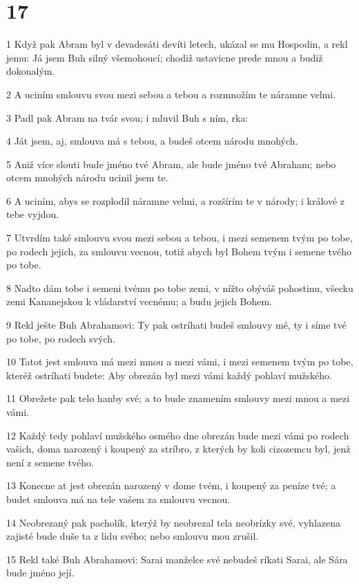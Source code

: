 \chapter{17}

\par 1 Když pak Abram byl v devadesáti devíti letech, ukázal se mu Hospodin, a rekl jemu: Já jsem Buh silný všemohoucí; chodiž ustavicne prede mnou a budiž dokonalým.
\par 2 A uciním smlouvu svou mezi sebou a tebou a rozmnožím te náramne velmi.
\par 3 Padl pak Abram na tvár svou; i mluvil Buh s ním, rka:
\par 4 Ját jsem, aj, smlouva má s tebou, a budeš otcem národu mnohých.
\par 5 Aniž více slouti bude jméno tvé Abram, ale bude jméno tvé Abraham; nebo otcem mnohých národu ucinil jsem te.
\par 6 A uciním, abys se rozplodil náramne velmi, a rozšírím te v národy; i králové z tebe vyjdou.
\par 7 Utvrdím také smlouvu svou mezi sebou a tebou, i mezi semenem tvým po tobe, po rodech jejich, za smlouvu vecnou, totiž abych byl Bohem tvým i semene tvého po tobe.
\par 8 Nadto dám tobe i semeni tvému po tobe zemi, v nížto obýváš pohostinu, všecku zemi Kananejskou k vládarství vecnému; a budu jejich Bohem.
\par 9 Rekl ješte Buh Abrahamovi: Ty pak ostríhati budeš smlouvy mé, ty i síme tvé po tobe, po rodech svých.
\par 10 Tatot jest smlouva má mezi mnou a mezi vámi, i mezi semenem tvým po tobe, kteréž ostríhati budete: Aby obrezán byl mezi vámi každý pohlaví mužského.
\par 11 Obrežete pak telo hanby své; a to bude znamením smlouvy mezi mnou a mezi vámi.
\par 12 Každý tedy pohlaví mužského osmého dne obrezán bude mezi vámi po rodech vašich, doma narozený i koupený za stríbro, z kterých by koli cizozemcu byl, jenž není z semene tvého.
\par 13 Konecne at jest obrezán narozený v dome tvém, i koupený za peníze tvé; a budet smlouva má na tele vašem za smlouvu vecnou.
\par 14 Neobrezaný pak pacholík, kterýž by neobrezal tela neobrízky své, vyhlazena zajisté bude duše ta z lidu svého; nebo smlouvu mou zrušil.
\par 15 Rekl také Buh Abrahamovi: Sarai manželce své nebudeš ríkati Sarai, ale Sára bude jméno její.
